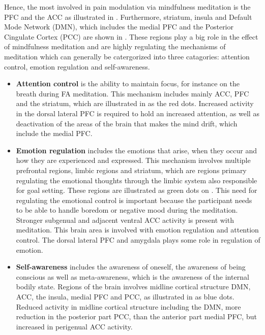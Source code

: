 Hence, the most involved in pain modulation via mindfulness meditation is the PFC and the ACC as illustrated in . Furthermore, striatum, insula and Default Mode Network (DMN), which includes the medial PFC and the Posterior Cingulate Cortex (PCC) are shown in . These regions play a big role in the effect of mindfulness meditation and are highly regulating the mechanisms of meditation which can generally be catergorized into three catagories: attention control, emotion regulation and self-awareness. 

  
\begin{itemize}
	\item \textbf{Attention control} is the ability to maintain focus, for instance on the breath during FA meditation. This mechanism includes mainly ACC, PFC and the striatum, which are illustrated in  as the red dots. Increased activity in the dorsal lateral PFC is required to hold an increased attention, as well as deactivation of the areas of the brain that makes the mind drift, which include the medial PFC. \cite{Tang2017}
	\item \textbf{Emotion regulation}
	includes the emotions that arise, when they occur and how they are experienced and expressed. This mechanism involves multiple prefrontal regions, limbic regions and striatum, which are regions primary regulating the emotional thoughts through the limbic system also responsible for goal setting. These regions are illustrated as green dots on . This need for regulating the emotional control is important because the participant needs to be able to handle boredom or negative mood during the meditation. Stronger subgenual and adjacent ventral ACC activity is present with meditation. This brain area is involved with emotion regulation and attention control. The dorsal lateral PFC and amygdala plays some role in regulation of emotion.  \cite{Tang2017}

	\item \textbf{Self-awareness} includes the awareness of oneself, the awareness of being conscious as well as meta-awareness, which is the awareness of the internal bodily state. Regions of the brain involves midline cortical structure DMN, ACC, the insula, medial PFC and PCC, as illustrated in  as blue dots. Reduced activity in midline cortical structure including the DMN, more reduction in the posterior part PCC, than the anterior part medial PFC, but increased in perigenual ACC activity.  \cite{Tang2017}
\end{itemize}


